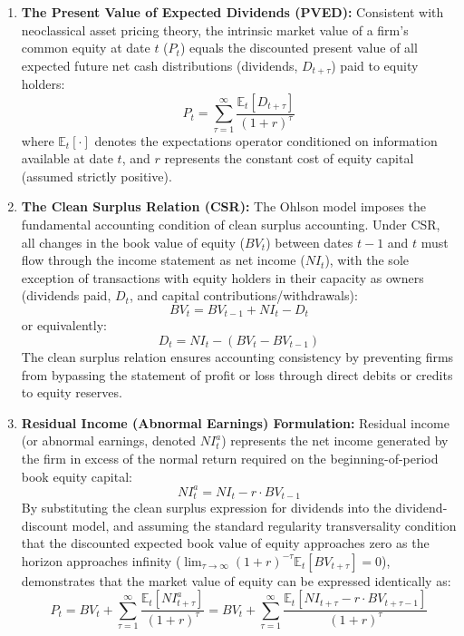 \begin{enumerate}
\item \textbf{The Present Value of Expected Dividends (PVED):}
Consistent with neoclassical asset pricing theory, the intrinsic market value of a firm's common equity at date $t$ ($P_t$) equals the discounted present value of all expected future net cash distributions (dividends, $D_{t+\tau}$) paid to equity holders:
\begin{equation}
P_t = \sum_{\tau=1}^{\infty} \frac{\mathbb{E}_t[D_{t+\tau}]}{(1 + r)^\tau}
\end{equation}
where $\mathbb{E}_t[\cdot]$ denotes the expectations operator conditioned on information available at date $t$, and $r$ represents the constant cost of equity capital (assumed strictly positive).

\item \textbf{The Clean Surplus Relation (CSR):}
The Ohlson model imposes the fundamental accounting condition of clean surplus accounting. Under CSR, all changes in the book value of equity ($BV_t$) between dates $t-1$ and $t$ must flow through the income statement as net income ($NI_t$), with the sole exception of transactions with equity holders in their capacity as owners (dividends paid, $D_t$, and capital contributions/withdrawals):
\begin{equation}
BV_t = BV_{t-1} + NI_t - D_t
\end{equation}
or equivalently:
\begin{equation}
D_t = NI_t - (BV_t - BV_{t-1})
\end{equation}
The clean surplus relation ensures accounting consistency by preventing firms from bypassing the statement of profit or loss through direct debits or credits to equity reserves.

\item \textbf{Residual Income (Abnormal Earnings) Formulation:}
Residual income (or abnormal earnings, denoted $NI_t^a$) represents the net income generated by the firm in excess of the normal return required on the beginning-of-period book equity capital:
\begin{equation}
NI_t^a = NI_t - r \cdot BV_{t-1}
\end{equation}
By substituting the clean surplus expression for dividends into the dividend-discount model, and assuming the standard regularity transversality condition that the discounted expected book value of equity approaches zero as the horizon approaches infinity ($\lim_{\tau \to \infty} (1+r)^{-\tau} \mathbb{E}_t[BV_{t+\tau}] = 0$), \citet{ohlson1995} demonstrates that the market value of equity can be expressed identically as:
\begin{equation}
P_t = BV_t + \sum_{\tau=1}^{\infty} \frac{\mathbb{E}_t[NI_{t+\tau}^a]}{(1 + r)^\tau} = BV_t + \sum_{\tau=1}^{\infty} \frac{\mathbb{E}_t[NI_{t+\tau} - r \cdot BV_{t+\tau-1}]}{(1 + r)^\tau}
\end{equation}


\end{enumerate}
